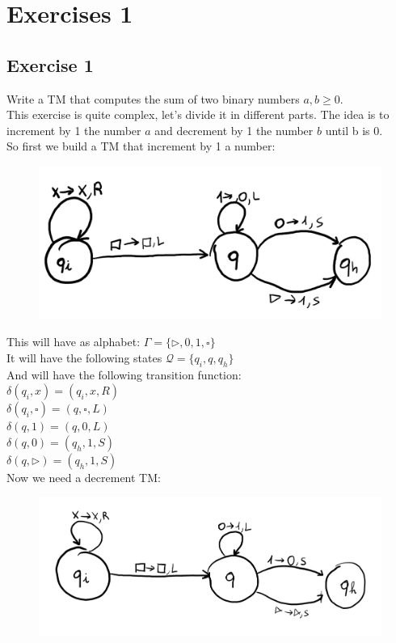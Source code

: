\section{Exercises 1}

\subsection{Exercise 1}
Write a TM that computes the sum of two binary numbers \(a,b \geq 0\).\\
This exercise is quite complex, let's divide it in different parts. The idea is to increment by 1 the number \(a\) and decrement by 1 the number \(b\) until b is 0.\\
So first we build a TM that increment by 1 a number:
\begin{figure}[H]
	\centerline{\includegraphics[scale=0.4]{figures/old/TM_increment_1}}
\end{figure}
This will have as alphabet:  \(\Gamma = \{\rhd, 0, 1,  \square\}\) \\
It will have the following states \(\mathcal{Q} = \{q_i, q, q_h\}\) \\
And will have the following transition function:\\
\(\delta (q_i, x) = (q_i, x, R)\)  \\
\(\delta (q_i, \square ) = (q, \square, L)\)  \\
\(\delta (q, 1 ) = (q, 0, L)\) \\
\(\delta (q, 0 ) = (q_h, 1, S)\) \\
\(\delta (q, \rhd ) = (q_h, 1, S)\) \\
Now we need a decrement TM:
\begin{figure}[H]
	\centerline{\includegraphics[scale=0.4]{figures/old/TM_decrement_1}}
\end{figure}
